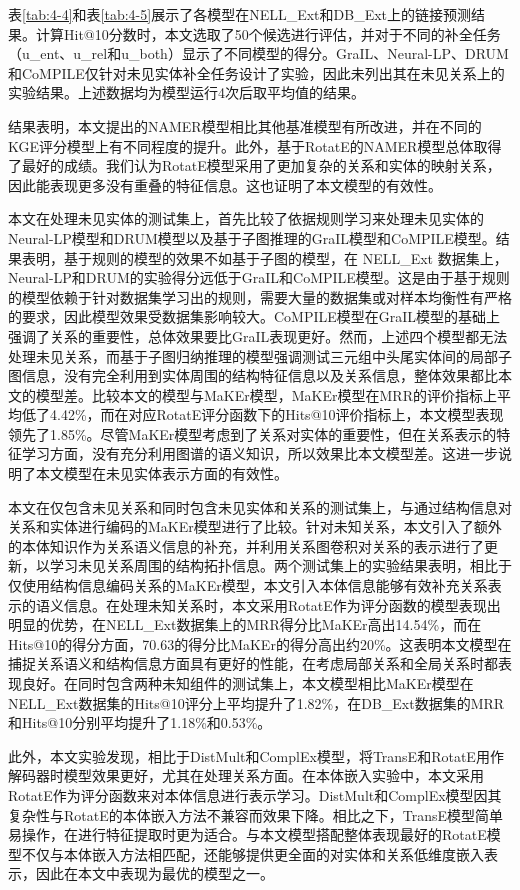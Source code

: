 表\ref{tab:4-4}和表\ref{tab:4-5}展示了各模型在NELL\_Ext和DB\_Ext上的链接预测结果。计算Hit@10分数时，本文选取了50个候选进行评估，并对于不同的补全任务（u\_ent、u\_rel和u\_both）显示了不同模型的得分。GraIL、Neural-LP、DRUM和CoMPILE仅针对未见实体补全任务设计了实验，因此未列出其在未见关系上的实验结果。上述数据均为模型运行4次后取平均值的结果。

结果表明，本文提出的NAMER模型相比其他基准模型有所改进，并在不同的KGE评分模型上有不同程度的提升。此外，基于RotatE的NAMER模型总体取得了最好的成绩。我们认为RotatE模型采用了更加复杂的关系和实体的映射关系，因此能表现更多没有重叠的特征信息。这也证明了本文模型的有效性。

本文在处理未见实体的测试集上，首先比较了依据规则学习来处理未见实体的Neural-LP模型和DRUM模型以及基于子图推理的GraIL模型和CoMPILE模型。结果表明，基于规则的模型的效果不如基于子图的模型，在 NELL\_Ext 数据集上，Neural-LP和DRUM的实验得分远低于GraIL和CoMPILE模型。这是由于基于规则的模型依赖于针对数据集学习出的规则，需要大量的数据集或对样本均衡性有严格的要求，因此模型效果受数据集影响较大。CoMPILE模型在GraIL模型的基础上强调了关系的重要性，总体效果要比GraIL表现更好。然而，上述四个模型都无法处理未见关系，而基于子图归纳推理的模型强调测试三元组中头尾实体间的局部子图信息，没有完全利用到实体周围的结构特征信息以及关系信息，整体效果都比本文的模型差。比较本文的模型与MaKEr模型，MaKEr模型在MRR的评价指标上平均低了4.42\%，而在对应RotatE评分函数下的Hits@10评价指标上，本文模型表现领先了1.85\%。尽管MaKEr模型考虑到了关系对实体的重要性，但在关系表示的特征学习方面，没有充分利用图谱的语义知识，所以效果比本文模型差。这进一步说明了本文模型在未见实体表示方面的有效性。

本文在仅包含未见关系和同时包含未见实体和关系的测试集上，与通过结构信息对关系和实体进行编码的MaKEr模型进行了比较。针对未知关系，本文引入了额外的本体知识作为关系语义信息的补充，并利用关系图卷积对关系的表示进行了更新，以学习未见关系周围的结构拓扑信息。两个测试集上的实验结果表明，相比于仅使用结构信息编码关系的MaKEr模型，本文引入本体信息能够有效补充关系表示的语义信息。在处理未知关系时，本文采用RotatE作为评分函数的模型表现出明显的优势，在NELL\_Ext数据集上的MRR得分比MaKEr高出14.54\%，而在Hits@10的得分方面，70.63的得分比MaKEr的得分高出约20\%。这表明本文模型在捕捉关系语义和结构信息方面具有更好的性能，在考虑局部关系和全局关系时都表现良好。在同时包含两种未知组件的测试集上，本文模型相比MaKEr模型在NELL\_Ext数据集的Hits@10评分上平均提升了1.82\%，在DB\_Ext数据集的MRR和Hits@10分别平均提升了1.18\%和0.53\%。

此外，本文实验发现，相比于DistMult和ComplEx模型，将TransE和RotatE用作解码器时模型效果更好，尤其在处理关系方面。在本体嵌入实验中，本文采用RotatE作为评分函数来对本体信息进行表示学习。DistMult和ComplEx模型因其复杂性与RotatE的本体嵌入方法不兼容而效果下降。相比之下，TransE模型简单易操作，在进行特征提取时更为适合。与本文模型搭配整体表现最好的RotatE模型不仅与本体嵌入方法相匹配，还能够提供更全面的对实体和关系低维度嵌入表示，因此在本文中表现为最优的模型之一。

